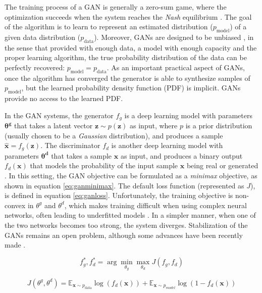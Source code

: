The training process of a GAN is generally a zero-sum game, where the optimization succeeds when the system reaches the \textit{Nash} equilibrium \autocite{nash48}. The goal of the algorithm is to learn to represent an estimated distribution ($p_{\mathrm{model}}$) of a given data distribution ($p_{\mathrm{data}}$). Moreover, GANs are designed to be unbiased \autocite{Goodfellow2016}, in the sense that provided with enough data, a model with enough capacity and the proper learning algorithm, the true probability distribution of the data can be perfectly recovered: $p_{\mathrm{model}} = p_{\mathrm{data}}$. As an important practical aspect of GANs, once the algorithm has converged the generator is able to synthesize samples of $p_\mathrm{model}$, but the learned probability density function (PDF) is implicit. GANs provide no access to the learned PDF.

In the GAN systems, the generator $f_g$ is a deep learning model with parameters $\mathbf{\theta^g}$ that takes a latent vector $\mathbf{z} \sim p(\mathbf{z})$ as input, where $p$ is a prior distribution (usually chosen to be a \textit{Gaussian} distribution), and produces a sample $\hat{\mathbf{x}}=f_g(\mathbf{z})$. The discriminator $f_d$ is another deep learning model with parameters $\mathbf{\theta^d}$ that takes a sample $\mathbf{x}$ as input, and produces a binary output $f_d(\mathbf{x})$ that models the probability of the input sample $\mathbf{x}$ being real or generated \autocite{Goodfellow2014}. In this setting, the GAN objective can be formulated as a \textit{minimax} objective, as shown in equation \ref{eq:ganminimax}. The default loss function (represented as $J$), is defined in equation \ref{eq:ganloss}. Unfortunately, the training objective is non-convex in $\theta^g$ and $\theta^d$, which makes training difficult when using complex neural networks, often leading to underfitted models \autocite{Goodfellow2016b,Goodfellow2016}. In a simpler manner, when one of the two networks becomes too strong, the system diverges. Stabilization of the GANs remains an open problem, although some advances have been recently made \autocite{arjovsky2017, shaobo2017, wang2022}.

\begin{equation}
	\label{eq:ganminimax}
	f_g^*, f_d^* = \arg \min_{\theta_g} \max_{\theta_d} J(f_g, f_d)
\end{equation}

\begin{equation}
	\label{eq:ganloss}
	J(\theta^g, \theta^d) = \mathbb{E}_{\mathbf{x}\sim p_\mathrm{data}} \log (f_d(\mathbf{x})) + \mathbb{E}_{\mathbf{x}\sim p_{model}} \log (1 - f_d(\mathbf{x}))
\end{equation}

